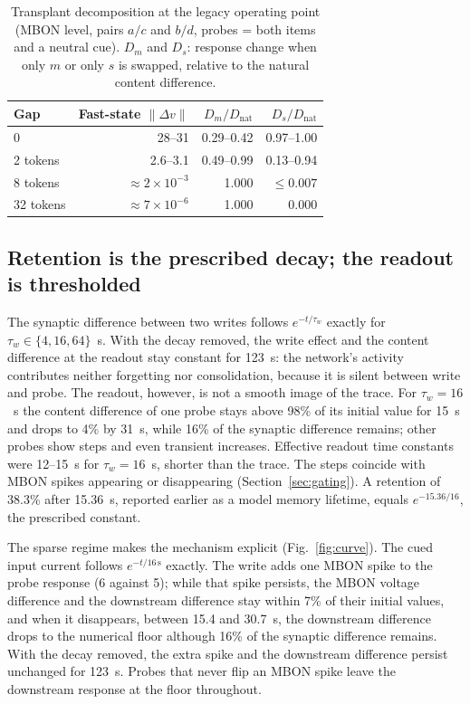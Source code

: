 \documentclass[conference]{IEEEtran}
\begin{document}
\begin{table}[t]
\caption{Transplant decomposition at the legacy operating point (MBON level,
pairs $a/c$ and $b/d$, probes = both items and a neutral cue). $D_m$ and $D_s$:
response change when only $m$ or only $s$ is swapped, relative to the natural
content difference.}
\label{tab:m1}\centering
\begin{tabular}{@{}lrrr@{}}\toprule
Gap & Fast-state $\lVert\Delta v\rVert$ & $D_m/D_{\mathrm{nat}}$ & $D_s/D_{\mathrm{nat}}$\\\midrule
0 & 28--31 & 0.29--0.42 & 0.97--1.00\\
2 tokens & 2.6--3.1 & 0.49--0.99 & 0.13--0.94\\
8 tokens & $\approx2\times10^{-3}$ & 1.000 & $\le0.007$\\
32 tokens & $\approx7\times10^{-6}$ & 1.000 & 0.000\\\bottomrule
\end{tabular}
\end{table}

\subsection{Retention is the prescribed decay; the readout is thresholded}
The synaptic difference between two writes follows $e^{-t/\tau_w}$ exactly for
$\tau_w\in\{4,16,64\}$~s. With the decay removed, the write effect and the
content difference at the readout stay constant for 123~s: the network's
activity contributes neither forgetting nor consolidation, because it is
silent between write and probe. The readout, however, is not a smooth image of
the trace. For $\tau_w=16$~s the content difference of one probe stays above
98\% of its initial value for 15~s and drops to 4\% by 31~s, while 16\% of the
synaptic difference remains; other probes show steps and even transient
increases. Effective readout time constants were 12--15~s for $\tau_w=16$~s,
shorter than the trace. The steps coincide with MBON spikes appearing or
disappearing (Section~\ref{sec:gating}). A retention of 38.3\% after 15.36~s,
reported earlier as a model memory lifetime, equals $e^{-15.36/16}$, the
prescribed constant.

The sparse regime makes the mechanism explicit (Fig.~\ref{fig:curve}). The
cued input current follows $e^{-t/16\,\mathrm{s}}$ exactly. The write adds one
MBON spike to the probe response (6 against 5); while that spike persists, the
MBON voltage difference and the downstream difference stay within 7\% of their
initial values, and when it disappears, between 15.4 and 30.7~s, the
downstream difference drops to the numerical floor although 16\% of the
synaptic difference remains. With the decay removed, the extra spike and the
downstream difference persist unchanged for 123~s. Probes that never flip an
MBON spike leave the downstream response at the floor throughout.
\end{document}
